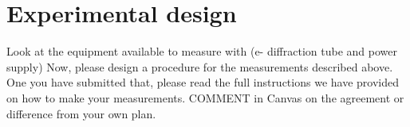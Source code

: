 \documentclass{tufte-handout}
\begin{document}
\section{Experimental design}

Look at the equipment available to measure with (e- diffraction tube and power supply)
Now, please design a procedure for the measurements described above.\\

One you have submitted that, please read the full instructions we have provided on how to make your measurements.  COMMENT in Canvas on the agreement or difference from your own plan.
\end{document}
